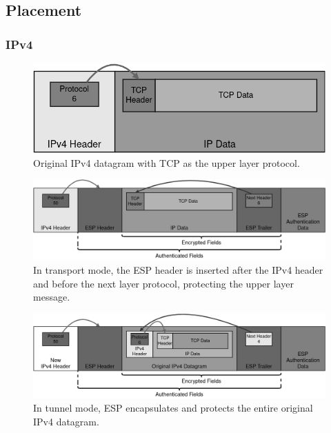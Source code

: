 \documentclass[a4paper,12pt]{report}
\begin{document}
		\subsection{Placement}
		\subsubsection{IPv4}
		
		\begin{figure}[!htb]
			\includegraphics[width=\textwidth,height=0.15\textheight,keepaspectratio]{original_ipv4_packet}
			\centering
			\caption{Original IPv4 datagram with TCP as the upper layer protocol.}
		\end{figure}
		
		\begin{figure}[!htb]
			\includegraphics[width=\textwidth]{esp_ipv4_transport}
			\centering
			\caption{In transport mode, the ESP header is inserted after the IPv4 header and before the next layer protocol, protecting the upper layer message.}
		\end{figure}
		
		\begin{figure}[!htb]
			\includegraphics[width=\textwidth]{esp_ipv4_tunnel}
			\centering
			\caption{In tunnel mode, ESP encapsulates and protects the entire original IPv4 datagram.}
		\end{figure}
\newpage
\end{document}
